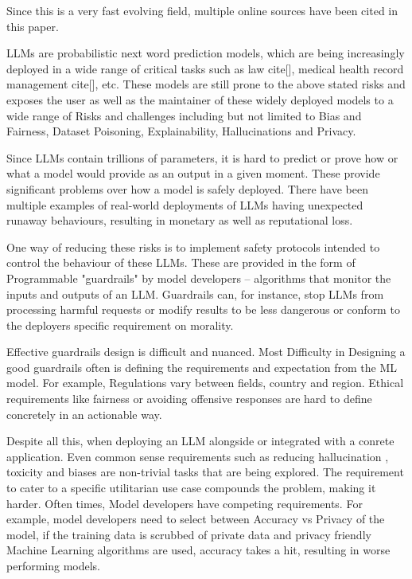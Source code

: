 \documentclass[11pt]{article}
\begin{document}
Since this is a very fast evolving field, multiple online sources have been cited in this paper.

LLMs are probabilistic next word prediction models, which are being increasingly deployed in a wide range of critical tasks such as law cite[], medical health record management cite[], etc. These models are still prone to the above stated risks and exposes the user as well as the maintainer of these widely deployed models to a wide range of Risks and challenges including but not limited to Bias and Fairness, Dataset Poisoning, Explainability, Hallucinations and Privacy. 

Since LLMs contain trillions of parameters, it is hard to predict or prove how or what a model would provide as an output in a given moment. These provide significant problems over how a model is safely deployed. There have been multiple examples of real-world deployments of LLMs having unexpected runaway behaviours, resulting in monetary as well as reputational loss.

One way of reducing these risks is to implement safety protocols intended to control the behaviour of these LLMs. These are provided in the form of Programmable "guardrails" by model developers – algorithms that monitor the inputs and outputs of an LLM.  Guardrails can, for instance, stop LLMs from processing harmful requests or modify results to be less dangerous or conform to the deployers specific requirement on morality.

Effective guardrails design is difficult and nuanced. Most Difficulty in Designing a good guardrails often is defining the requirements and expectation from the ML model. For example, Regulations vary between fields, country and region. Ethical requirements like fairness or avoiding offensive responses are hard to define concretely in an actionable way.

Despite all this, when deploying an LLM alongside or integrated with a conrete application. Even common sense requirements such as reducing hallucination \cite{xu2024hallucination} , toxicity \cite{wen2023unveiling} and biases\cite{taubenfeld2024systematic} are non-trivial tasks that are being explored. The requirement to cater to a specific utilitarian use case compounds the problem, making it harder. Often times, Model developers have competing requirements. For example, model developers need to select between Accuracy vs Privacy of the model, if the training data is scrubbed of private data and privacy friendly Machine Learning algorithms are used, accuracy takes a hit, resulting in worse performing models.
\end{document}
